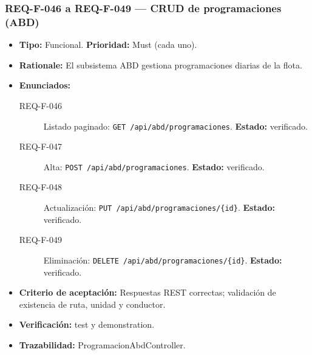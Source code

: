 \documentclass[12pt,a4paper]{article}
\begin{document}
\subsubsection{REQ-F-046 a REQ-F-049 --- CRUD de programaciones (ABD)}
\begin{itemize}
  \item \textbf{Tipo:} Funcional. \textbf{Prioridad:} Must (cada uno).
  \item \textbf{Rationale:} El subsistema ABD gestiona programaciones diarias de la flota.
  \item \textbf{Enunciados:}
    \begin{description}
      \item[REQ-F-046] Listado paginado: \texttt{GET /api/abd/programaciones}. \textbf{Estado:} verificado.
      \item[REQ-F-047] Alta: \texttt{POST /api/abd/programaciones}. \textbf{Estado:} verificado.
      \item[REQ-F-048] Actualización: \texttt{PUT /api/abd/programaciones/\{id\}}. \textbf{Estado:} verificado.
      \item[REQ-F-049] Eliminación: \texttt{DELETE /api/abd/programaciones/\{id\}}. \textbf{Estado:} verificado.
    \end{description}
  \item \textbf{Criterio de aceptación:} Respuestas REST correctas; validación de existencia de ruta, unidad y conductor.
  \item \textbf{Verificación:} test y demonstration.
  \item \textbf{Trazabilidad:} ProgramacionAbdController.
\end{itemize}
\end{document}
